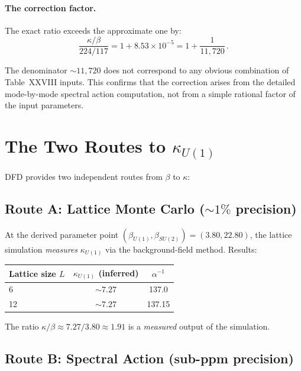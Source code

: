 \documentclass[12pt,a4paper]{article}
\begin{document}
\paragraph{The correction factor.}
The exact ratio exceeds the approximate one by:
\begin{equation}
\frac{\kappa/\beta}{224/117} = 1 + 8.53 \times 10^{-5}
= 1 + \frac{1}{11{,}720}\,.
\end{equation}

The denominator $\sim 11{,}720$ does not correspond to any obvious
combination of Table~XXVIII inputs.  This confirms that the correction
arises from the detailed mode-by-mode spectral action computation, not
from a simple rational factor of the input parameters.

\section{The Two Routes to $\kappa_{U(1)}$}

DFD provides two independent routes from $\beta$ to $\kappa$:

\subsection{Route A: Lattice Monte Carlo ($\sim 1\%$ precision)}

At the derived parameter point $(\beta_{U(1)}, \beta_{SU(2)}) = (3.80, 22.80)$,
the lattice simulation \emph{measures} $\kappa_{U(1)}$ via the
background-field method.  Results:
\begin{center}
\renewcommand{\arraystretch}{1.2}
\begin{tabular}{lcc}
\toprule
Lattice size $L$ & $\kappa_{U(1)}$ (inferred) & $\alpha^{-1}$ \\
\midrule
6 & $\sim 7.27$ & 137.0 \\
12 & $\sim 7.27$ & 137.15 \\
\bottomrule
\end{tabular}
\end{center}

The ratio $\kappa/\beta \approx 7.27/3.80 \approx 1.91$ is a
\emph{measured} output of the simulation.

\subsection{Route B: Spectral Action (sub-ppm precision)}
\end{document}
